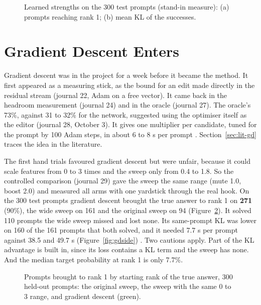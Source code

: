 \begin{figure}[!htb]
\centering
{}
\caption{Learned strengths on the 300 test prompts (stand-in measure): (a) prompts reaching rank 1; (b) mean KL of the successes.}\label{fig:learned}
\end{figure}

\section{Gradient Descent Enters}\label{sec:gd-enters}

Gradient descent was in the project for a week before it became the method. It first appeared as a measuring stick, as the bound for an edit made directly in the residual stream (journal 22, Adam on a free vector). It came back in the headroom measurement (journal 24) and in the oracle (journal 27). The oracle's 73\%, against 31 to 32\% for the network, suggested using the optimiser itself as the editor (journal 28, October 3). It gives one multiplier per candidate, tuned for the prompt by 100 Adam steps, in about 6 to 8 s per prompt \cite{p12,p13}. Section~\ref{sec:lit-gd} traces the idea in the literature.

The first hand trials favoured gradient descent but were unfair, because it could scale features from 0 to 3 times and the sweep only from 0.4 to 1.8. So the controlled comparison (journal 29) gave the sweep the same range (mute 1.0, boost 2.0) and measured all arms with one yardstick through the real hook. On the 300 test prompts gradient descent brought the true answer to rank 1 on \textbf{271} (90\%), the wide sweep on 161 and the original sweep on 94 (Figure~\ref{fig:gdband}). It solved 110 prompts the wide sweep missed and lost none. Its same-prompt KL was lower on 160 of the 161 prompts that both solved, and it needed 7.7 s per prompt against 38.5 and 49.7 s (Figure~\ref{fig:gdside}) \cite{p13}. Two cautions apply. Part of the KL advantage is built in, since its loss contains a KL term and the sweep has none. And the median target probability at rank 1 is only 7.7\%.

\begin{figure}[!htb]
\centering
{}
\caption{Prompts brought to rank 1 by starting rank of the true answer, 300 held-out prompts: the original sweep, the sweep with the same 0 to 3 range, and gradient descent (green).}\label{fig:gdband}
\end{figure}

